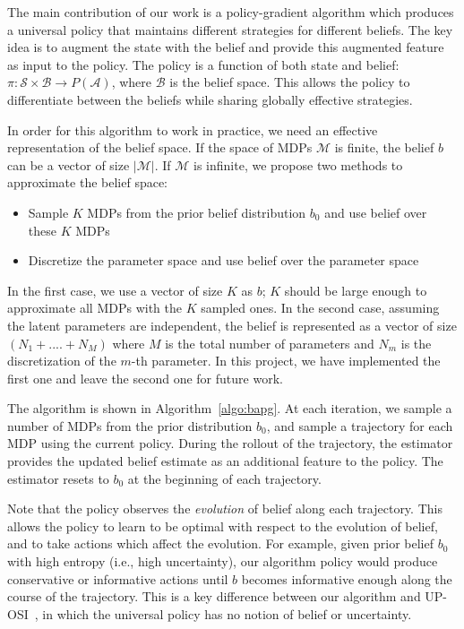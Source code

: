 \documentclass{article}
\newcommand{\aref}[1]{Algorithm~\ref{#1}}%
\begin{document}
The main contribution of our work is a policy-gradient algorithm which produces a universal policy that maintains different strategies for different beliefs. The key idea is to augment the state with the belief and provide this augmented feature as input to the policy. The policy is a function of both state and belief: $\pi: \mathcal{S} \times \mathcal{B} \rightarrow P(\mathcal{A})$, where $\mathcal{B}$ is the belief space. This allows the policy to differentiate between the beliefs while sharing globally effective strategies.

In order for this algorithm to work in practice, we need an effective representation of the belief space. If the space of MDPs $\mathcal{M}$ is finite, the belief $b$ can be a vector of size $|\mathcal{M}|$. If $\mathcal{M}$ is infinite, we propose two methods to approximate the belief space:

\begin{itemize}
    \item Sample $K$ MDPs from the prior belief distribution $b_0$ and use belief over these $K$ MDPs
    \item Discretize the parameter space and use belief over the parameter space
\end{itemize}
In the first case, we use a vector of size $K$ as $b$; $K$ should be large enough to approximate all MDPs with the $K$ sampled ones. In the second case, assuming the latent parameters are independent, the belief is represented as a vector of size $(N_1 + .... + N_M)$ where $M$ is the total number of parameters and $N_m$ is the discretization of the $m$-th parameter. In this project, we have implemented the first one and leave the second one for future work.

The algorithm is shown in \aref{algo:bapg}. At each iteration, we sample a number of MDPs from the prior distribution $b_0$, and sample a trajectory for each MDP using the current policy. During the rollout of the trajectory, the estimator provides the updated belief estimate as an additional feature to the policy. The estimator resets to $b_0$ at the beginning of each trajectory.

Note that the policy observes the \emph{evolution} of belief along each trajectory. This allows the policy to learn to be optimal with respect to the evolution of belief, and to take actions which affect the evolution. For example, given prior belief $b_0$ with high entropy (i.e., high uncertainty), our algorithm policy would produce conservative or informative actions until $b$ becomes informative enough along the course of the trajectory. This is a key difference between our algorithm and UP-OSI~\cite{yu2017uposi}, in which the universal policy has no notion of belief or uncertainty.
\end{document}
